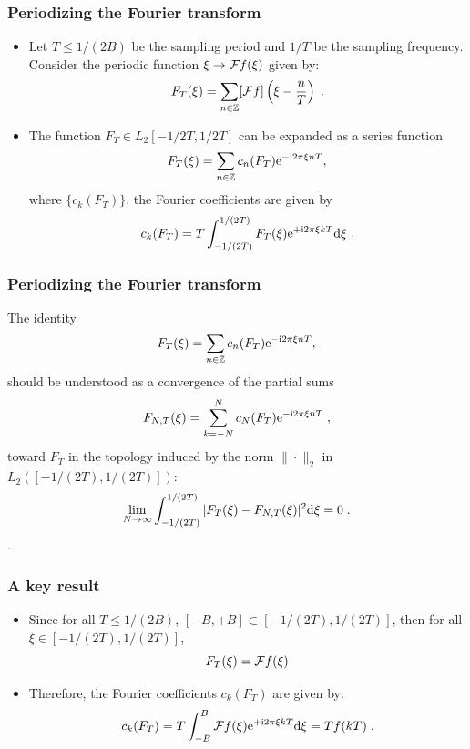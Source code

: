 \begin{frame}
\frametitle{Periodizing the Fourier transform}
\begin{itemize}
\item Let $T \leq 1/(2B)$ be the \alert{sampling period} and $1/T$ be the \alert{sampling frequency}.
Consider the periodic function $\xi \to \mathcal{F} f(\xi)$ given by:
$$
F_T (\xi) = \sum_{n \in \mathbb{Z}} [\mathcal{F} f] \left( \xi - \frac{n}{T} \right) \;.
$$
\item The function  $F_T \in L_2{[-1/2T,1/2T]}$ can be expanded as a series function
\begin{equation*}
F_T (\xi) = \sum_{n \in \mathbb{Z}} c_n(F_T) \mathrm{e}^{- \mathrm{i} 2 \pi \xi n T},
\end{equation*}
where $\{c_k(F_T)\}$, the Fourier coefficients are given by
\begin{equation*}
c_k(F_T) = T \int_{-1/(2T)}^{1/(2T)} F_T(\xi) \mathrm{e}^{+ \mathrm{i} 2 \pi \xi k T} \mathrm{d} \xi\;.
\end{equation*}
\end{itemize}
\end{frame}

\begin{frame}
\frametitle{Periodizing the Fourier transform}
The identity
\begin{equation*}
F_T (\xi) = \sum_{n \in \mathbb{Z}} c_n(F_T) \mathrm{e}^{- \mathrm{i} 2 \pi \xi n T},
\end{equation*}
should be understood as a convergence of the partial sums
\begin{equation*}
F_{N,T}(\xi)= \sum_{k=-N}^N c_N(F_T) \mathrm{e}^{- \mathrm{i} 2 \pi \xi n T} \;,
\end{equation*}
toward $F_T$ in the topology induced by the norm $\|\cdot\|_2$  in $L_2([-1/(2T),1/(2T)])$:
$$
\lim_{N \to \infty} \int_{-1/(2T)}^{1/(2T)} |F_T(\xi) - F_{N,T}(\xi)|^2 \mathrm{d} \xi =0 \;.
$$
.
\end{frame}

\begin{frame}
\frametitle{A key result}
\begin{itemize}
\item Since for all $T \leq 1/(2B)$, $[-B,+B] \subset [-1/(2T), 1/(2T)]$, then for all $\xi \in [-1/(2T),1/(2T)]$,
\alert{
$$F_T(\xi) = \mathcal{F} f(\xi) $$
}
\item Therefore, the  Fourier coefficients $c_k(F_T)$ are given by:
\alert{
\begin{equation*}
c_k(F_T) = T \int_{-B}^{B} \mathcal{F} f(\xi) \mathrm{e}^{+ \mathrm{i} 2 \pi \xi k T} \mathrm{d} \xi= T f(kT)\;.
\end{equation*}
}
\end{itemize}
\end{frame}



